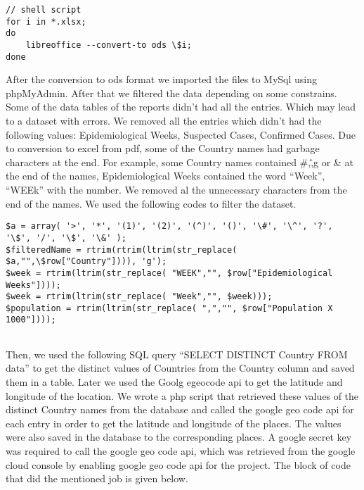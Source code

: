 \documentclass[conference]{IEEEtran}
\begin{document}
\begin{lstlisting}
// shell script
for i in *.xlsx; 
do 
	libreoffice --convert-to ods \$i; 
done

\end{lstlisting}


After the conversion to ods format we imported the files to MySql using phpMyAdmin. After that we filtered the data depending on some constrains. Some of the data tables of the reports didn’t had all the entries. Which may lead to a dataset with errors. We removed all the entries which didn’t had the following values: Epidemiological Weeks, Suspected Cases, Confirmed Cases. 
Due to conversion to excel from pdf, some of the Country names had garbage characters at the end. For example, some Country names contained \#,\^,g or \& at the end of the names, Epidemiological Weeks contained the word “Week”, “WEEk” with the number. We removed al the unnecessary characters from the end of the names. We used the following codes to filter the dataset. 

\begin{lstlisting}
$a = array( '>', '*', '(1)', '(2)', '(^)', '()', '\#', '\^', '?', '\$', '/', '\$', '\&' );
$filteredName = rtrim(rtrim(ltrim(str_replace( $a,"",\$row["Country"]))), 'g'); 
$week = rtrim(ltrim(str_replace( "WEEK","", $row["Epidemiological Weeks"]))); 
$week = rtrim(ltrim(str_replace( "Week","", $week))); 
$population = rtrim(ltrim(str_replace( ",","", $row["Population X 1000"])));


\end{lstlisting}

Then, we used the following SQL query “SELECT DISTINCT Country
FROM data” to get the distinct values of Countries from the Country column and saved them in a table. Later we used the Goolg egeocode api to get the latitude and longitude of the location. We wrote a php script that retrieved these values of the distinct Country names from the database and called the google geo code api for each entry in order to get the latitude and longitude of the places. The values were also saved in the database to the corresponding places. A google secret key was required to call the google geo code api, which was retrieved from the google cloud console by enabling google geo code api for the project. The block of code that did the mentioned job is given below.
\end{document}
